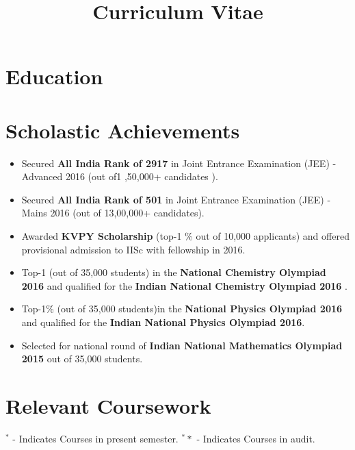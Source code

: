 \documentclass[11pt,a4paper,sans]{moderncv}        %
\title{Curriculum Vitae}                               %
\begin{document}
\makecvtitle

\section{Education}

\section{Scholastic Achievements}
\begin{itemize}
\item Secured \textbf{All India Rank of 2917 }in Joint Entrance Examination (JEE) -Advanced 2016 (out of1 ,50,000+ candidates ).
\item  Secured \textbf{All India Rank of 501} in Joint Entrance Examination (JEE) -Mains 2016 (out of 13,00,000+ candidates).
\item Awarded \textbf{KVPY Scholarship} (top-1 \% out of 10,000 applicants) and offered provisional admission to IISc with fellowship in 2016.
\item Top-1 (out of 35,000 students) in the \textbf{National Chemistry Olympiad 2016} and qualified for the \textbf{Indian National Chemistry Olympiad 2016} .
\item  Top-1\% (out of 35,000 students)in the \textbf{National Physics Olympiad 2016} and qualified for the \textbf{Indian National Physics Olympiad 2016}.
\item Selected for national round of \textbf{Indian National Mathematics Olympiad 2015} out of 35,000 students.
\end{itemize}

\section{Relevant Coursework}
\vspace{0.70em}
{$^*$} - Indicates Courses in present semester. {$^**$} - Indicates Courses in audit.
\end{document}

